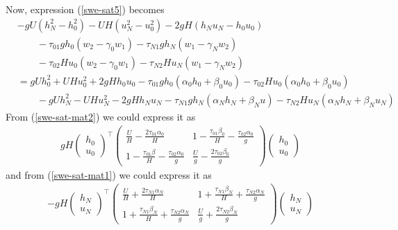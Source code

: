 \documentclass{article}
\theoremstyle{definition}
\begin{document}
    Now, expression (\ref{swe-sat5}) becomes
    \begin{align}
        & -gU (h_N^2 - h_0^2) - UH(u_N^2 - u_0^2) - 2gH(h_Nu_N - h_0u_0) \nonumber \\
        & \qquad  - \tau_{01} gh_0 \left(w_2 - \gamma_0 w_1 \right)
        - \tau_{N1} gh_N \left(w_1 - \gamma_N w_2 \right) \nonumber \\
        & \qquad  - \tau_{02} Hu_0 \left(w_2 - \gamma_0 w_1 \right)
        - \tau_{N2} Hu_N \left(w_1 - \gamma_N w_2 \right) \label{swe-sat6}  \\
        &= gUh_0^2 + UHu_0^2 + 2gHh_0 u_0 - \tau_{01}gh_0 (\alpha_0 h_0+ \beta_0 u_0) - \tau_{02}Hu_0 (\alpha_0 h_0+ \beta_0 u_0) \label{swe-sat-mat2}\\
        &\qquad  -gU h_N^2 - UH u_N^2 - 2gHh_N u_N - \tau_{N1}gh_N(\alpha_N h_N+ \beta_N u) - \tau_{N2}Hu_N (\alpha_N h_N+ \beta_N u_N) \label{swe-sat-mat1}
    \end{align}
    From (\ref{swe-sat-mat2}) we could express it as 
    \begin{align}
        gH
        \begin{pmatrix}
            h_0 \\ u_0
        \end{pmatrix}^\top 
        \begin{pmatrix}
        \frac{U}{H} - \frac{2\tau_{01}\alpha_0 }{H} & 1 - \frac{\tau_{01}\beta_0}{H} - \frac{\tau_{02}\alpha_0}{g} \\
        1 - \frac{\tau_{01}\beta}{H} - \frac{\tau_{02}\alpha_0}{g} & \frac{U}{g} - \frac{2\tau_{02}\beta_0}{g}
        \end{pmatrix}
        \begin{pmatrix}
            h_0 \\ u_0
        \end{pmatrix}
    \end{align}
    and from (\ref{swe-sat-mat1}) we could express it as 
    \begin{align}
        -gH
        \begin{pmatrix}
            h_N \\ u_N
        \end{pmatrix}^\top 
        \begin{pmatrix}
        \frac{U}{H} +\frac{2\tau_{N1}\alpha_N }{H} & 1 + \frac{\tau_{N1}\beta_N}{H} + \frac{\tau_{N2}\alpha_N}{g} \\
        1 + \frac{\tau_{N1}\beta_N}{H} + \frac{\tau_{N2}\alpha_N}{g} & \frac{U}{g} + \frac{2\tau_{N2}\beta_N}{g}
        \end{pmatrix}
        \begin{pmatrix}
            h_N \\ u_N
        \end{pmatrix}
    \end{align}
\end{document}
